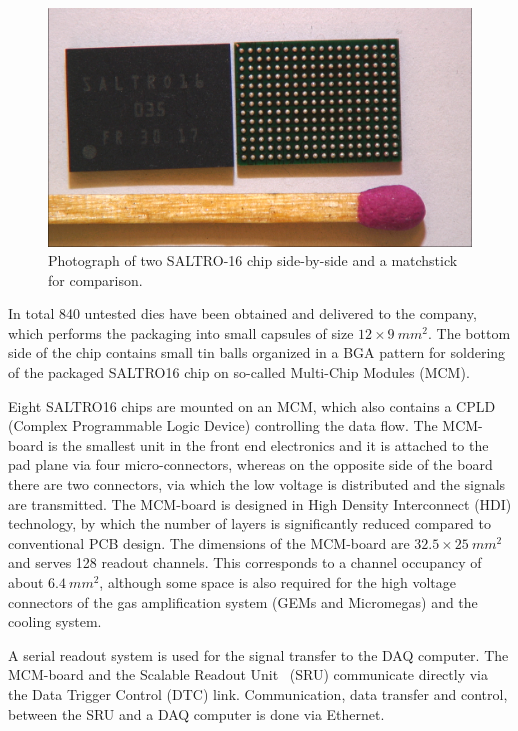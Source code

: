 \begin{figure}
    \centering
    \includegraphics[width=.5\linewidth]{Tracker/TPC_Bonn/plots/TPC-Electronics_JonssonsALTRO_Chip-Photo_07062018}
    \caption{Photograph of two SALTRO-16 chip side-by-side and a matchstick for comparison.}
    \label{fig:TPC:SaltroPic}
\end{figure}

In total 840 untested dies have been obtained and delivered to the company, which performs the packaging into small capsules of size $12\times\SI{9}{mm^2}$. The bottom side of the chip contains small tin balls organized in a BGA pattern for soldering of the packaged SALTRO16 chip on so-called Multi-Chip Modules (MCM).

Eight SALTRO16 chips are mounted on an MCM, which also contains a CPLD (Complex Programmable Logic Device) controlling the data flow. The MCM-board is the smallest unit in the front end electronics and it is attached to the pad plane via four micro-connectors, whereas on the opposite side of the board there are two connectors, via which the low voltage is distributed and the signals are transmitted. The MCM-board is designed in High Density Interconnect (HDI) technology, by which the number of layers is significantly reduced compared to conventional PCB design. The dimensions of the MCM-board are $32.5 \times \SI{25}{mm^2}$ and serves 128 readout channels. This corresponds to a channel occupancy of about $\SI{6.4}{mm^{2}}$, although some space is also required for the high voltage connectors of the gas amplification system (GEMs and Micromegas) and the cooling system.

A serial readout system is used for the signal transfer to the DAQ computer. The MCM-board and the Scalable Readout Unit~\cite{1748-0221-8-03-C03015} (SRU) communicate directly via the Data Trigger Control (DTC) link. Communication, data transfer and control, between the SRU and a DAQ computer is done via Ethernet.

